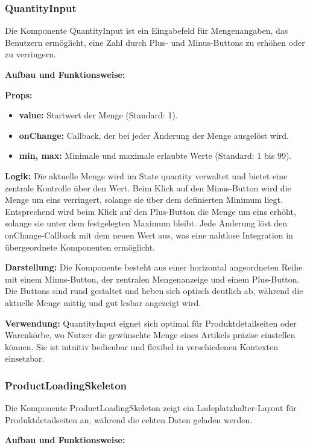 \subsubsection{QuantityInput}
Die Komponente QuantityInput ist ein Eingabefeld für Mengenangaben, das Benutzern ermöglicht, eine Zahl durch Plus- und Minus-Buttons zu erhöhen oder zu verringern.

\noindent\textbf{Aufbau und Funktionsweise:}

\textbf{Props:}
\begin{itemize}
    \item \textbf{value:} Startwert der Menge (Standard: 1).
    \item \textbf{onChange:} Callback, der bei jeder Änderung der Menge ausgelöst wird.
    \item \textbf{min, max:} Minimale und maximale erlaubte Werte (Standard: 1 bis 99).
\end{itemize}

\textbf{Logik:}
Die aktuelle Menge wird im State quantity verwaltet und bietet eine zentrale Kontrolle über den Wert. Beim Klick auf den Minus-Button wird die Menge um eins verringert, solange sie über dem definierten Minimum liegt. Entsprechend wird beim Klick auf den Plus-Button die Menge um eins erhöht, solange sie unter dem festgelegten Maximum bleibt. Jede Änderung löst den onChange-Callback mit dem neuen Wert aus, was eine nahtlose Integration in übergeordnete Komponenten ermöglicht.

\textbf{Darstellung:}
Die Komponente besteht aus einer horizontal angeordneten Reihe mit einem Minus-Button, der zentralen Mengenanzeige und einem Plus-Button. Die Buttons sind rund gestaltet und heben sich optisch deutlich ab, während die aktuelle Menge mittig und gut lesbar angezeigt wird.

\noindent\textbf{Verwendung:} QuantityInput eignet sich optimal für Produktdetailseiten oder Warenkörbe, wo Nutzer die gewünschte Menge eines Artikels präzise einstellen können. Sie ist intuitiv bedienbar und flexibel in verschiedenen Kontexten einsetzbar.

\subsubsection{ProductLoadingSkeleton}
Die Komponente ProductLoadingSkeleton zeigt ein Ladeplatzhalter-Layout für Produktdetailseiten an, während die echten Daten geladen werden.

\noindent\textbf{Aufbau und Funktionsweise:}

